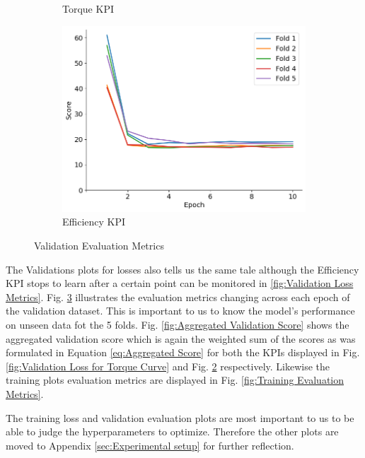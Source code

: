 \documentclass{report} %
\begin{document}
\begin{figure}[H]
\begin{subfigure}{0.32\textwidth}
        \caption{\centering Torque \ac{KPI}}
        \label{fig:Validation Score for Torque Curve}
    \end{subfigure}\hfill
    \begin{subfigure}{0.32\textwidth}
        \centering
        \includegraphics[width=\textwidth]{./ReportImages/val_score_y2.png}
        \caption{\centering Efficiency \ac{KPI}}
        \label{fig:Validation Score for Efficiency grid}
    \end{subfigure}
    \caption{Validation Evaluation Metrics}
    \label{fig:Validation Evaluation Metrics}
\end{figure} 

The Validations plots for losses also tells us the same tale although the Efficiency \ac{KPI} stops to learn after a certain point can be monitored in \ref{fig:Validation Loss Metrics}.
Fig. \ref{fig:Validation Evaluation Metrics} illustrates the evaluation metrics changing across each epoch of the validation dataset. This is important to us to know 
the model's performance on unseen data fot the 5 folds. Fig. \ref{fig:Aggregated Validation Score} shows the aggregated validation score which is again the weighted 
sum of the scores as was formulated in Equation \ref{eq:Aggregated Score} for both the \ac{KPI}s displayed in Fig. \ref{fig:Validation Loss for Torque Curve} and Fig. 
\ref{fig:Validation Score for Efficiency grid} respectively. Likewise the training plots evaluation metrics are displayed in Fig. \ref{fig:Training Evaluation Metrics}.

The training loss and validation evaluation plots are most important to us to be able to judge the hyperparameters to optimize. 
Therefore the other plots are moved to Appendix \ref{sec:Experimental setup} for further reflection.
\end{document}
